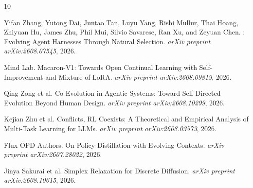 \documentclass[11pt,a4paper]{article}
\begin{document}

\begin{thebibliography}{10}

Yifan Zhang, Yutong Dai, Juntao Tan, Luyu Yang, Rishi Mullur, Thai Hoang, Zhiyuan Hu, James Zhu, Phil Mui, Silvio Savarese, Ran Xu, and Zeyuan Chen.
: Evolving Agent Harnesses Through Natural Selection.
\newblock \emph{arXiv preprint arXiv:2608.07545}, 2026.

Mind Lab.
\newblock Macaron-V1: Towards Open Continual Learning with Self-Improvement and Mixture-of-{LoRA}.
\newblock \emph{arXiv preprint arXiv:2608.09819}, 2026.

Qing Zong et al.
\newblock Co-Evolution in Agentic Systems: Toward Self-Directed Evolution Beyond Human Design.
\newblock \emph{arXiv preprint arXiv:2608.10299}, 2026.

Kejian Zhu et al.
 Conflicts, {RL} Coexists: A Theoretical and Empirical Analysis of Multi-Task Learning for {LLMs}.
\newblock \emph{arXiv preprint arXiv:2608.03573}, 2026.

Flux-{OPD} Authors.
\newblock On-Policy Distillation with Evolving Contexts.
\newblock \emph{arXiv preprint arXiv:2607.28022}, 2026.

Jinya Sakurai et al.
\newblock Simplex Relaxation for Discrete Diffusion.
\newblock \emph{arXiv preprint arXiv:2608.10615}, 2026.

\end{thebibliography}
\end{document}
